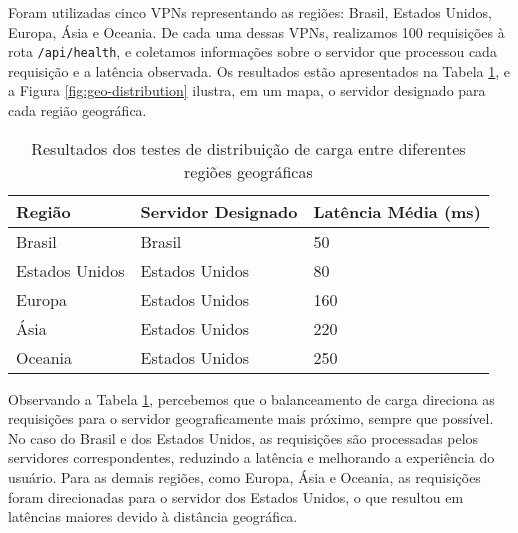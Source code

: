 Foram utilizadas cinco VPNs representando as regiões: Brasil, Estados Unidos, Europa, Ásia e Oceania. De cada uma dessas VPNs, realizamos 100 requisições à rota \texttt{/api/health}, e coletamos informações sobre o servidor que processou cada requisição e a latência observada. Os resultados estão apresentados na Tabela \ref{tab:geo-distribution}, e a Figura \ref{fig:geo-distribution} ilustra, em um mapa, o servidor designado para cada região geográfica.

\begin{table}[H]
    \centering
    \caption{Resultados dos testes de distribuição de carga entre diferentes regiões geográficas}
    \label{tab:geo-distribution}
    \begin{tabular}{|l|l|l|}
        \hline
        \textbf{Região}   & \textbf{Servidor Designado} & \textbf{Latência Média (ms)} \\ \hline
        Brasil         & Brasil                      & 50                   \\ \hline
        Estados Unidos & Estados Unidos              & 80                  \\ \hline
        Europa         & Estados Unidos             & 160                  \\ \hline
        Ásia           & Estados Unidos                      & 220                  \\ \hline
        Oceania        & Estados Unidos              & 250                  \\ \hline
    \end{tabular}
\end{table}


Observando a Tabela \ref{tab:geo-distribution}, percebemos que o balanceamento de carga direciona as requisições para o servidor geograficamente mais próximo, sempre que possível. No caso do Brasil e dos Estados Unidos, as requisições são processadas pelos servidores correspondentes, reduzindo a latência e melhorando a experiência do usuário. Para as demais regiões, como Europa, Ásia e Oceania, as requisições foram direcionadas para o servidor dos Estados Unidos, o que resultou em latências maiores devido à distância geográfica.

